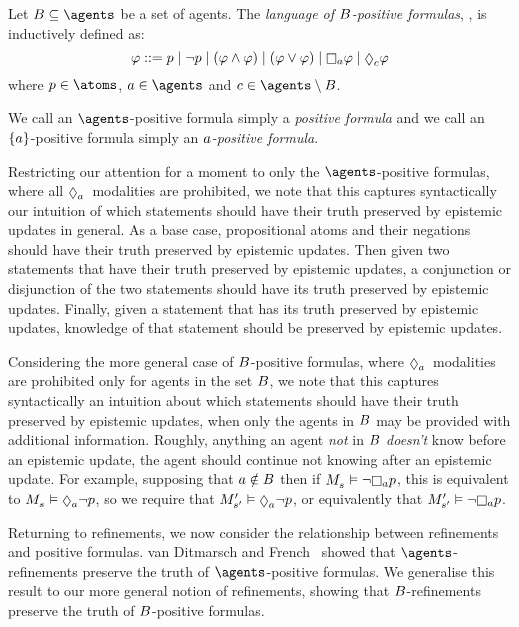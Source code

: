 \begin{definition}
Let $\agentsB \subseteq \agents$ be a set of agents.
The {\em language of $B$-positive formulas}, \langMlPlusBs{}, is inductively defined as:
$$
\phi ::= 
    \atomP \mid
    \lnot \atomP \mid
    (\phi \land \phi) \mid
    (\phi \lor \phi) \mid
    \necessaryA \phi \mid
    \possibleC \phi
$$
where $\atomP \in \atoms$, $\agentA \in \agents$ and $\agentC \in \agents \setminus \agentsB$.
\end{definition}

We call an $\agents$-positive formula simply a {\em positive formula} and we call an $\{a\}$-positive formula simply an {\em $a$-positive formula}.

Restricting our attention for a moment to only the $\agents$-positive formulas, where all $\possibleA$~modalities are prohibited, we note that this captures syntactically our intuition of which statements should have their truth preserved by epistemic updates in general.
As a base case, propositional atoms and their negations should have their truth preserved by epistemic updates.
Then given two statements that have their truth preserved by epistemic updates, a conjunction or disjunction of the two statements should have its truth preserved by epistemic updates.
Finally, given a statement that has its truth preserved by epistemic updates, knowledge of that statement should be preserved by epistemic updates. 

Considering the more general case of $B$-positive formulas, where $\possibleA$~modalities are prohibited only for agents in the set $B$, we note that this captures syntactically an intuition about which statements should have their truth preserved by epistemic updates, when only the agents in $B$ may be provided with additional information.
Roughly, anything an agent {\em not} in $B$ {\em doesn't} know before an epistemic update, the agent should continue not knowing after an epistemic update.
For example, supposing that $a \notin B$ then if $\kPModel{\kStateS} \entails \lnot \knowsA \atomP$, this is equivalent to $\kPModel{\kStateS} \entails \possibleA \lnot \atomP$, so we require that $\kPModelP{\kStateSP} \entails \possibleA \lnot \atomP$, or equivalently that $\kPModelP{\kStateSP} \entails \lnot \knowsA \atomP$.

Returning to refinements, we now consider the relationship between refinements and positive formulas.
van Ditmarsch and French~\cite{vanditmarsch:2009} showed that $\agents$-refinements preserve the truth of $\agents$-positive formulas.
We generalise this result to our more general notion of refinements, showing that $B$-refinements preserve the truth of $B$-positive formulas.

